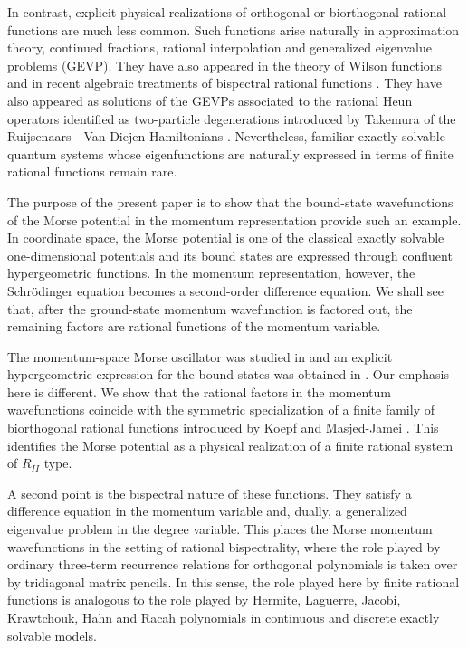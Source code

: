 \documentclass[11pt,reqno]{amsart}
\numberwithin{equation}{section}
\begin{document}
In contrast, explicit physical realizations of orthogonal or biorthogonal
rational functions are much less common.  Such functions arise naturally in
approximation theory, continued fractions, rational interpolation and generalized
eigenvalue problems (GEVP)\cite{IsmailMasson1994,Zhedanov1999, Rosengren, Rosengren2}.  They have also appeared
in the theory of Wilson functions and in recent algebraic treatments of
bispectral rational functions \cite{Groenevelt2003,TsujimotoVinetZhedanov2020,BussiereGaboriaudVinetZhedanov2022}.
They have also appeared as solutions of the GEVPs \cite{tsujimoto2023rational, tsujimoto2026ruijsenaars, tsujimoto2026rational} associated to the rational Heun operators identified as two-particle degenerations introduced by Takemura \cite{takemura2017degenerations} of the Ruijsenaars - Van Diejen Hamiltonians \cite{ruijsenaars2004integrable, van1994integrability}. Nevertheless, familiar exactly solvable quantum systems whose eigenfunctions are
naturally expressed in terms of finite rational functions remain rare.

The purpose of the present paper is to show that the bound-state wavefunctions of
the Morse potential in the momentum representation provide such an example.  In
coordinate space, the Morse potential is one of the classical exactly solvable
one-dimensional potentials and its bound states are expressed through confluent
hypergeometric functions.  In the momentum representation, however, the
Schr\"odinger equation becomes a second-order difference equation.  We shall see
that, after the ground-state momentum wavefunction is factored out, the remaining
factors are rational functions of the momentum variable.

The momentum-space Morse oscillator was studied in \cite{DahlSpringborg1988} and
an explicit hypergeometric expression for the bound states was obtained in
\cite{SunDong2012}.  Our emphasis here is different.  We show that the rational
factors in the momentum wavefunctions coincide with the symmetric specialization
of a finite family of biorthogonal rational functions introduced by Koepf and
Masjed-Jamei \cite{KoepfMasjedJamei2007}.  This identifies the Morse potential as
a physical realization of a finite rational system of $R_{II}$ type.

A second point is the bispectral nature of these functions.  They satisfy a
difference equation in the momentum variable and, dually, a generalized eigenvalue
problem in the degree variable.  This places the Morse momentum wavefunctions in
the setting of rational bispectrality, where the role played by ordinary
three-term recurrence relations for orthogonal polynomials is taken over by
tridiagonal matrix pencils.  In this sense, the role played here by finite rational
functions is analogous to the role played by Hermite, Laguerre, Jacobi,
Krawtchouk, Hahn and Racah polynomials in continuous and discrete exactly
solvable models.
\end{document}
